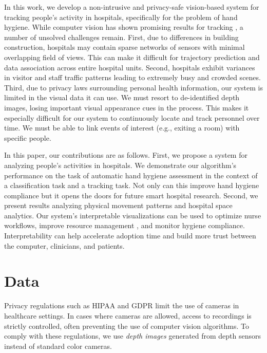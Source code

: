 \documentclass[twoside,11pt]{article}
\begin{document}
In this work, we develop a non-intrusive and privacy-safe vision-based system for tracking people’s activity in hospitals, specifically for the problem of hand hygiene.
While computer vision has shown promising results for tracking \citep{zhang2008global}, a number of unsolved challenges remain.
First, due to differences in building construction, hospitals may contain sparse networks of sensors with minimal overlapping field of views.
This can make it difficult for trajectory prediction and data association \citep{leibe2007coupled} across entire hospital units.
Second, hospitals exhibit variances in visitor and staff traffic patterns leading to extremely busy and crowded scenes.
Third, due to privacy laws surrounding personal health information, our system is limited in the visual data it can use.
We must resort to de-identified depth images, losing important visual appearance cues in the process.
This makes it especially difficult for our system to continuously locate and track personnel over time.
We must be able to link events of interest (e.g., exiting a room) with specific people.

In this paper, our contributions are as follows.
First, we propose a system for analyzing people's activities in hospitals.
We demonstrate our algorithm's performance on the task of automatic hand hygiene assessment in the context of a classification task and a tracking task.
Not only can this improve hand hygiene compliance  but it opens the doors for future smart hospital research.
Second, we present results analyzing physical movement patterns and hospital space analytics.
Our system's interpretable visualizations can be used to optimize nurse workflows, improve resource management \citep{fry2005mascal}, and monitor hygiene compliance.
Interpretability can help accelerate adoption time and build more trust between the computer, clinicians, and patients.

\section{Data}

Privacy regulations such as HIPAA and GDPR limit the use of cameras in healthcare settings.
In cases where cameras are allowed, access to recordings is strictly controlled, often preventing the use of computer vision algorithms.
To comply with these regulations, we use \textit{depth images} generated from depth sensors instead of standard color cameras. 
\end{document}
